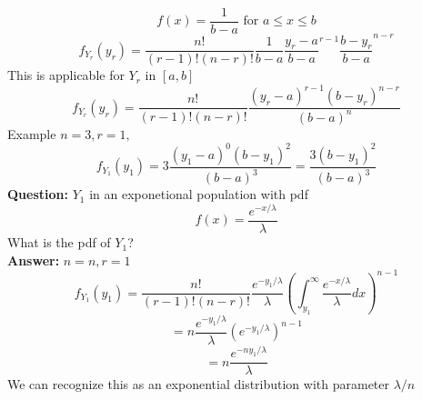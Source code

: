 \documentclass{article}
\begin{document}
$$ f(x) = \frac{1}{b-a} \text{ for } a \leq x \leq b$$
$$ f_{Y_r}(y_r) = \frac{n!}{(r-1)!(n-r)!} \frac{1}{b-a} \frac{y_r -a}{b-a}^{r-1} \frac{b-y_r}{b-a}^{n-r}$$
This is applicable for $Y_r$ in $[a,b]$\\
$$ f_{Y_r}(y_r) = \frac{n!}{(r-1)!(n-r)!} \frac{(y_r -a)^{r-1} (b-y_r)^{n-r}}{(b-a)^n}$$
Example
$n = 3, r = 1, $
$$ f_{Y_1}(y_1) = 3 \frac{(y_1 - a)^0 (b-y_1)^2}{(b-a)^3} = \frac{3(b-y_1)^2}{(b-a)^3}$$
\textbf{Question: } $Y_1$ in an exponetional population with pdf 
$$ f(x) = \frac{e^{-x/\lambda}}{\lambda}$$
What is the pdf of $Y_1$?\\
\textbf{Answer: } $n = n, r = 1$
$$ f_{Y_1}(y_1) = \frac{n!}{(r-1)!(n-r)!} \frac{e^{-y_1/\lambda}}{\lambda} (\int_{y_1}^{\infty} \frac{e^{-x/\lambda}}{\lambda} dx)^{n-1}$$
$$ = n \frac{e^{-y_1/\lambda}}{\lambda} (e^{-y_1/\lambda})^{n-1}$$
$$ = n \frac{e^{-n y_1/\lambda}}{\lambda} $$
We can recognize this as an exponential distribution with parameter $\lambda/n$\\
\end{document}
